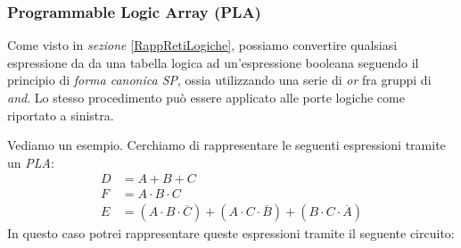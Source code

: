 \subsubsection*{Programmable Logic Array (PLA)}
%
\begin{minipage}[c]{0.48\textwidth}
\end{minipage}
\begin{minipage}[c]{0.48\textwidth}
	Come visto in \textit{sezione} \ref{RappRetiLogiche}, possiamo convertire qualsiasi espressione da da una tabella logica ad un'espressione booleana seguendo il principio di \textit{forma canonica SP}, ossia utilizzando una serie di \textit{or} fra gruppi di \textit{and}. Lo stesso procedimento può essere applicato alle porte logiche come riportato a sinistra.
\end{minipage}
\vskip3mm
Vediamo un esempio. Cerchiamo di rappresentare le seguenti espressioni tramite un \textit{PLA}:
\begin{align*}
	D & =A+B+C                                                                                        \\
	F & =A \cdot B \cdot C                                                                            \\
	E & =(A \cdot B \cdot \overline{C})+(A \cdot C \cdot \overline{B})+(B \cdot C \cdot \overline{A})
\end{align*}
In questo caso potrei rappresentare queste espressioni tramite il seguente circuito:
